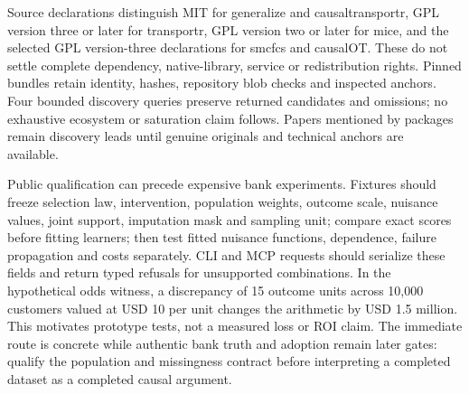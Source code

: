 Source declarations distinguish MIT for generalize and causaltransportr, GPL version three or later for transportr, GPL version two or later for mice, and the selected GPL version-three declarations for smcfcs and causalOT. These do not settle complete dependency, native-library, service or redistribution rights. Pinned bundles retain identity, hashes, repository blob checks and inspected anchors. Four bounded discovery queries preserve returned candidates and omissions; no exhaustive ecosystem or saturation claim follows. Papers mentioned by packages remain discovery leads until genuine originals and technical anchors are available.~\citep{exec25_rtm_generalize,exec25_rtm_transportr,exec25_rtm_causaltransportr,exec25_rtm_mice,exec25_rtm_smcfcs,exec25_rtm_causalOT,exec25_rtm_choice}

Public qualification can precede expensive bank experiments. Fixtures should freeze selection law, intervention, population weights, outcome scale, nuisance values, joint support, imputation mask and sampling unit; compare exact scores before fitting learners; then test fitted nuisance functions, dependence, failure propagation and costs separately. CLI and MCP requests should serialize these fields and return typed refusals for unsupported combinations. In the hypothetical odds witness, a discrepancy of 15 outcome units across 10,000 customers valued at USD 10 per unit changes the arithmetic by USD 1.5 million. This motivates prototype tests, not a measured loss or ROI claim. The immediate route is concrete while authentic bank truth and adoption remain later gates: qualify the population and missingness contract before interpreting a completed dataset as a completed causal argument.~\citep{exec25_rtm_choice}
